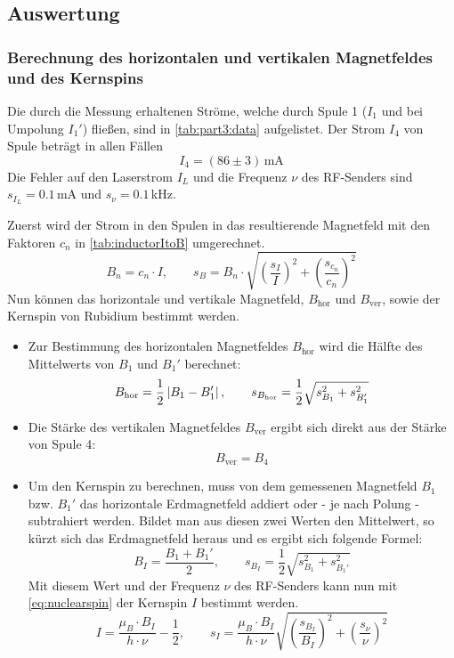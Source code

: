 \subsection{Auswertung}
\subsubsection{Berechnung des horizontalen und vertikalen Magnetfeldes und des Kernspins}
Die durch die Messung erhaltenen Ströme, welche durch Spule 1 ($I_1$ und bei Umpolung $I_1'$) fließen, sind in \autoref{tab:part3:data} 
aufgelistet. Der Strom $I_4$ von Spule beträgt in allen Fällen
\begin{equation}
    I_4 = (86 \pm 3)\,\text{mA}
\end{equation}
Die Fehler auf den Laserstrom $I_L$ und die Frequenz $\nu$ des RF-Senders sind $s_{I_L} = 0.1$\,mA und $s_\nu=0.1$\,kHz. 

Zuerst wird der Strom in den Spulen in das resultierende Magnetfeld mit den Faktoren $c_n$ in \autoref{tab:inductorItoB} umgerechnet.
\begin{equation}
    B_n = c_n \cdot I, \qquad s_{B} = B_n \cdot \sqrt{ \left( \frac{s_I}{I} \right)^2 + \left( \frac{s_{c_n}}{c_n} \right)^2 }
\end{equation}
Nun können das horizontale und vertikale Magnetfeld, $B_\text{hor}$ und $B_\text{ver}$, sowie der Kernspin von Rubidium bestimmt werden.
\begin{itemize}
    \item Zur Bestimmung des horizontalen Magnetfeldes $B_\text{hor}$ wird die Hälfte des Mittelwerts von $B_1$ und $B_1'$ berechnet:
    \begin{equation}
        B_\text{hor} = \frac{1}{2} \left|B_1 - B_1'\right|, \qquad s_{B_\text{hor}} = \frac{1}{2} \sqrt{s_{B_1}^2 + s_{B_1'}^2}
    \end{equation}
    \item Die Stärke des vertikalen Magnetfeldes $B_\text{ver}$ ergibt sich direkt aus der Stärke von Spule 4:
    \begin{equation}
        B_\text{ver} = B_4
    \end{equation}
    \item Um den Kernspin zu berechnen, muss von dem gemessenen Magnetfeld $B_1$ bzw. $B_1'$ das horizontale Erdmagnetfeld addiert oder - je nach
    Polung - subtrahiert werden. Bildet man aus diesen zwei Werten den Mittelwert, so kürzt sich das Erdmagnetfeld heraus und es ergibt sich
    folgende Formel:
    \begin{equation}
        B_I = \frac{B_1 + B_1'}{2}, \qquad s_{B_I} = \frac{1}{2} \sqrt{s_{B_1}^2 + s_{B_1'}^2}
    \end{equation}
    Mit diesem Wert und der Frequenz $\nu$ des RF-Senders kann nun mit \autoref{eq:nuclearspin} der Kernspin $I$ bestimmt werden.
    \begin{equation}
        I = \frac{\mu_B \cdot B_I}{h \cdot \nu} - \frac{1}{2}, \qquad s_I = \frac{\mu_B \cdot B_I}{h \cdot \nu} \sqrt{ \left( \frac{s_{B_I}}{B_I} \right)^2 + \left( \frac{s_\nu}{\nu} \right)^2}
    \end{equation}
\end{itemize}

